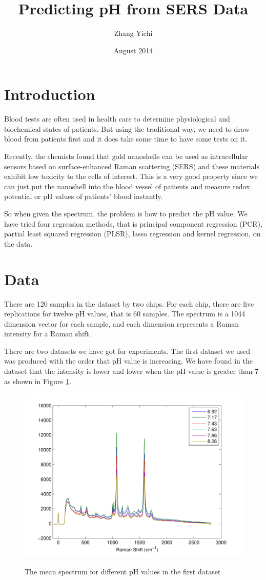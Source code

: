 \documentclass[a4paper]{article}
\begin{document}
\title{\textbf{Predicting pH from SERS Data}}
\author{Zhang Yichi}
\date{August 2014}
\maketitle

\section{Introduction}
Blood tests are often used in health care to determine physiological and biochemical states of patients. But using the traditional way, we need to draw blood from patients first and it does take some time to have some tests on it. 

Recently, the chemists found that gold nanoshells can be used as intracellular sensors based on surface-enhanced Raman scattering (SERS) and these materials exhibit low toxicity to the cells of interest. This is a very good property since we can just put the nanoshell into the blood vessel of patients and measure redox potential or pH values of patients' blood instantly.

So when given the spectrum, the problem is how to predict the pH value. We have tried four regression methods, that is principal component regression (PCR), partial least squared regression (PLSR), lasso regression and kernel regression, on the data.

\section{Data}
There are 120 samples in the dataset by two chips. For each chip, there are five replications for twelve pH values, that is 60 samples. The spectrum is a 1044 dimension vector for each sample, and each dimension represents a Raman intensity for a Raman shift.

There are two datasets we have got for experiments. The first dataset we used was produced with the order that pH value is increasing. We have found in the dataset that the intensity is lower and lower when the pH value is greater than 7 as shown in Figure \ref{pic1}.

\begin{figure}[h]
  \centering
  \includegraphics[width=.6\textwidth]{images/compare.pdf}\\
  \caption{The mean spectrum for different pH values in the first dataset}\label{pic1}
\end{figure}
\end{document}

